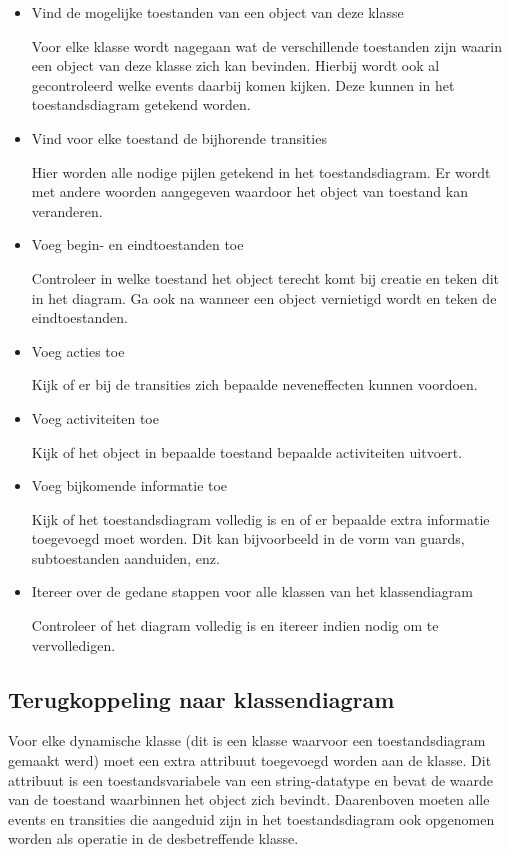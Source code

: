 \begin{itemize}
    \item Vind de mogelijke toestanden van een object van deze klasse
    
    Voor elke klasse wordt nagegaan wat de verschillende toestanden zijn waarin een object van deze klasse zich kan bevinden. Hierbij wordt ook al gecontroleerd welke events daarbij komen kijken. Deze kunnen in het toestandsdiagram getekend worden.
    \item Vind voor elke toestand de bijhorende transities
    
    Hier worden alle nodige pijlen getekend in het toestandsdiagram. Er wordt met andere woorden aangegeven waardoor het object van toestand kan veranderen.
    \item Voeg begin- en eindtoestanden toe
    
    Controleer in welke toestand het object terecht komt bij creatie en teken dit in het diagram. Ga ook na wanneer een object vernietigd wordt en teken de eindtoestanden.
    \item Voeg acties toe
    
    Kijk of er bij de transities zich bepaalde neveneffecten kunnen voordoen.
    \item Voeg activiteiten toe
    
    Kijk of het object in bepaalde toestand bepaalde activiteiten uitvoert.
    \item Voeg bijkomende informatie toe
    
    Kijk of het toestandsdiagram volledig is en of er bepaalde extra informatie toegevoegd moet worden. Dit kan bijvoorbeeld in de vorm van guards, subtoestanden aanduiden, enz.
    
    \item Itereer over de gedane stappen voor alle klassen van het klassendiagram
    
    Controleer of het diagram volledig is en itereer indien nodig om te vervolledigen.
\end{itemize}

\subsection{ Terugkoppeling naar klassendiagram}

Voor elke dynamische klasse (dit is een klasse waarvoor een toestandsdiagram gemaakt werd) moet een extra attribuut toegevoegd worden aan de klasse. Dit attribuut is een toestandsvariabele van een string-datatype en bevat de waarde van de toestand waarbinnen het object zich bevindt.
Daarenboven moeten alle events en transities die aangeduid zijn in het toestandsdiagram ook opgenomen worden als operatie in de desbetreffende klasse.

